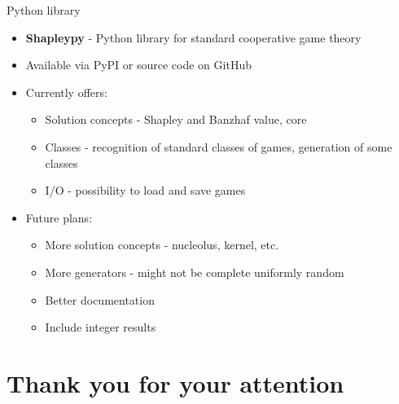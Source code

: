 \documentclass{beamer}
\begin{document}
\begin{frame}{Python library}
    \pause
    \begin{itemize}
        \item \textbf{Shapleypy} - Python library for standard cooperative game theory
        \pause
        \item Available via PyPI or source code on GitHub
        \pause
        \item Currently offers:
        \begin{itemize}
            \item Solution concepts - Shapley and Banzhaf value, core
            \item Classes - recognition of standard classes of games, generation of some classes
            \item I/O - possibility to load and save games
        \end{itemize}
        \pause
        \item Future plans:
        \begin{itemize}
            \item More solution concepts - nucleolus, kernel, etc.
            \item More generators - might not be complete uniformly random
            \item Better documentation
            \item Include integer results
        \end{itemize}
    \end{itemize}
    
\end{frame}


\section{Thank you for your attention}
\end{document}
